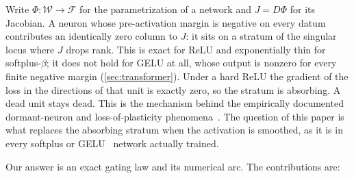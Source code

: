 \documentclass[11pt]{article}
\theoremstyle{definition}
\theoremstyle{remark}
\begin{document}
Write $\Phi:\mathcal{W}\to\mathcal{F}$ for the parametrization of a network and
$J=D\Phi$ for its Jacobian. A neuron whose pre-activation margin is negative on
every datum contributes an identically zero column to $J$: it sits on a stratum
of the singular locus where $J$ drops rank. This is exact for ReLU and
exponentially thin for softplus-$\beta$; it does not hold for GELU at all, whose
output is nonzero for every finite negative margin (\cref{sec:transformer}).
Under a hard ReLU the gradient of the
loss in the directions of that unit is exactly zero, so the stratum is absorbing.
A dead unit stays dead. This is the mechanism behind the empirically documented
dormant-neuron and loss-of-plasticity
phenomena~\cite{Sokar23,Lyle23,Dohare24}. The question of this paper is what
replaces the absorbing stratum when the activation is smoothed, as it is in every
softplus or GELU~\cite{HG16} network actually trained.

Our answer is an exact gating law and its numerical arc. The contributions are:
\end{document}
